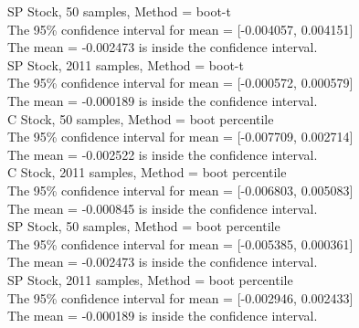\documentclass{article}
\begin{document}
SP Stock, 50 samples, Method = boot-t\\
The 95\% confidence interval for mean = [-0.004057, 0.004151]\\
The mean = -0.002473 is inside the confidence interval.\\


SP Stock, 2011 samples, Method = boot-t\\
The 95\% confidence interval for mean = [-0.000572, 0.000579]\\
The mean = -0.000189 is inside the confidence interval.\\


C Stock, 50 samples, Method = boot percentile\\
The 95\% confidence interval for mean = [-0.007709, 0.002714]\\
The mean = -0.002522 is inside the confidence interval.\\


C Stock, 2011 samples, Method = boot percentile\\
The 95\% confidence interval for mean = [-0.006803, 0.005083]\\
The mean = -0.000845 is inside the confidence interval.\\


SP Stock, 50 samples, Method = boot percentile\\
The 95\% confidence interval for mean = [-0.005385, 0.000361]\\
The mean = -0.002473 is inside the confidence interval.\\


SP Stock, 2011 samples, Method = boot percentile\\
The 95\% confidence interval for mean = [-0.002946, 0.002433]\\
The mean = -0.000189 is inside the confidence interval.\\
\end{document}
